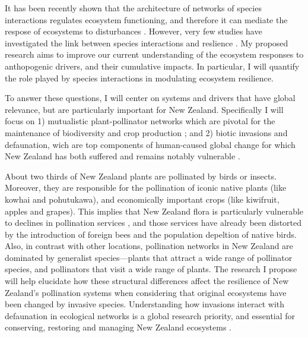 \documentclass[a4paper]{report}
\begin{document}
It has been recently shown that the architecture of networks of species interactions regulates ecosystem functioning, and therefore it can mediate the respose of ecosystems to disturbances \cite{Rezende2007, Bastolla2009, Berlow2009, Stouffer2010, Stouffer2012}. 
However, very few studies have investigated the link between species interactions and reslience \cite{Lever2014, Tylianakis2014}. 
My proposed research aims to improve our current understanding of the ecosystem responses to anthopogenic drivers, and their cumulative impacts. 
In particular, I will quantify the role played by species interactions in modulating ecosystem resilience.

To answer these questions, I will center on systems and drivers that have global relevance, but are particularly important for New Zealand. 
Specifically I will focus on 1) mutualistic plant-pollinator networks which are pivotal for the maintenance of biodiversity and crop production \cite{Bascompte2007, Klein2007}; and 2) biotic invasions and defaunation, wich are top components of human-caused global change for which New Zealand has both suffered and remains notably vulnerable \cite{Vitousek1997}. 

About two thirds of New Zealand plants are pollinated by birds or insects. 
Moreover, they are responsible for the pollination of iconic native plants (like kowhai and pohutukawa), and economically important crops (like kiwifruit, apples and grapes). 
This implies that New Zealand flora is particularly vulnerable to declines in pollination services \cite{Newstrom2005}, and those services have already been distorted by the introduction of foreign bees \cite{Huryn1995} and the population depeltion of native birds\cite{Anderson2003, Robertson2009}.
Also, in contrast with other locations, pollination networks in New Zealand are dominated by generalist species\cite{Heine1937, Primack1983}---plants that attract a wide range of pollinator species, and pollinators that visit a wide range of plants. 
The research I propose will help elucidate how these structural differences affect the resilience of New Zealand's pollination systems when considering that original ecosystems have been changed by invasive species.
Understanding how invasions interact with defaunation in ecological networks is a global research priority, and essential for conserving, restoring and managing New Zealand ecosystems \cite{Newstrom2005}. 
\end{document}
